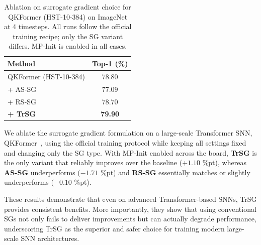 \begin{table}[h]
\centering
\small
\begin{tabular}{lc}
\toprule
\textbf{Method} & \textbf{Top-1 (\%)} \\
\midrule
QKFormer (HST-10-384) & 78.80 \\
\quad + AS-SG         & 77.09 \\
\quad + RS-SG         & 78.70 \\
\quad \textbf{+ TrSG} & \textbf{79.90} \\
\bottomrule
\end{tabular}
\caption{Ablation on surrogate gradient choice for QKFormer (HST-10-384) on ImageNet at 4 timesteps. 
All runs follow the official training recipe; only the SG variant differs. 
MP-Init is enabled in all cases.}
\label{tab:qkformer_ablation}
\end{table}

We ablate the surrogate gradient formulation on a large-scale Transformer SNN, QKFormer~\cite{zhou:2024_2}, using the official training protocol while keeping all settings fixed and changing only the SG type. With MP-Init enabled across the board, \textbf{TrSG} is the only variant that reliably improves over the baseline ($+1.10$ \%pt), whereas \textbf{AS-SG} underperforms ($-1.71$ \%pt) and \textbf{RS-SG} essentially matches or slightly underperforms ($-0.10$ \%pt). 

These results demonstrate that even on advanced Transformer-based SNNs, TrSG provides consistent benefits. More importantly, they show that using conventional SGs not only fails to deliver improvements but can actually degrade performance, underscoring TrSG as the superior and safer choice for training modern large-scale SNN architectures.


